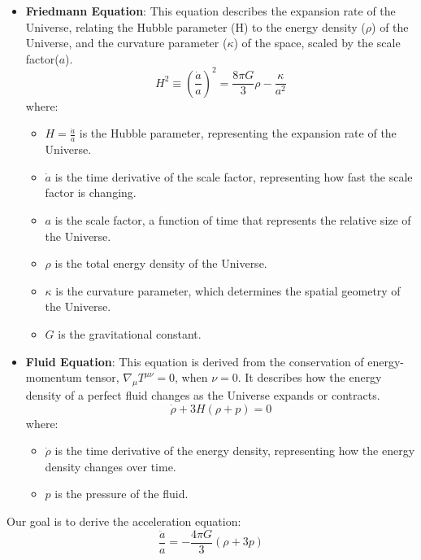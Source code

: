 \documentclass{article}
\begin{document}
\begin{itemize}
    \item \textbf{Friedmann Equation}: This equation describes the expansion rate of the Universe, relating the Hubble parameter (H) to the energy density ($\rho$) of the Universe, and the curvature parameter ($\kappa$) of the space, scaled by the scale factor($a$).
    \begin{equation}
        H^{2} \equiv \left(\frac{\dot{a}}{a}\right)^{2}=\frac{8 \pi G}{3} \rho-\frac{\kappa}{a^{2}}
        \label{eq:friedmann}
    \end{equation}
    where:
    \begin{itemize}
        \item $H = \frac{\dot{a}}{a}$ is the Hubble parameter, representing the expansion rate of the Universe.
        \item $\dot{a}$ is the time derivative of the scale factor, representing how fast the scale factor is changing.
        \item $a$ is the scale factor, a function of time that represents the relative size of the Universe.
        \item $\rho$ is the total energy density of the Universe.
        \item $\kappa$ is the curvature parameter, which determines the spatial geometry of the Universe.
        \item $G$ is the gravitational constant.
    \end{itemize}
    \item \textbf{Fluid Equation}: This equation is derived from the conservation of energy-momentum tensor, $\nabla_{\mu}T^{\mu\nu} = 0$, when $\nu = 0$. It describes how the energy density of a perfect fluid changes as the Universe expands or contracts.
    \begin{equation}
        \dot{\rho}+3 H(\rho+p)=0
        \label{eq:fluid}
    \end{equation}
    where:
    \begin{itemize}
        \item $\dot{\rho}$ is the time derivative of the energy density, representing how the energy density changes over time.
        \item $p$ is the pressure of the fluid.
    \end{itemize}
\end{itemize}

Our goal is to derive the acceleration equation:
\begin{equation}
\frac{\ddot{a}}{a} = -\frac{4\pi G}{3}(\rho + 3p)
\label{eq:acceleration}
\end{equation}
\end{document}
